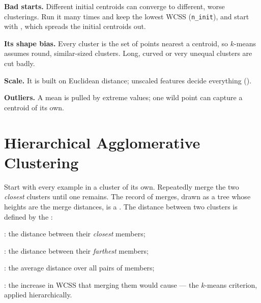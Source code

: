 \begin{alertbox}
\begin{tight}
  \item \textbf{Bad starts.} Different initial centroids can converge to different,
        worse clusterings. Run it many times and keep the lowest WCSS
        (\texttt{n\_init}), and start with , which spreads the
        initial centroids out.
  \item \textbf{Its shape bias.} Every cluster is the set of points nearest a
        centroid, so $k$-means assumes round, similar-sized clusters. Long,
        curved or very unequal clusters are cut badly.
  \item \textbf{Scale.} It is built on Euclidean distance; unscaled features
        decide everything ().
  \item \textbf{Outliers.} A mean is pulled by extreme values; one wild point can
        capture a centroid of its own.
\end{tight}
\end{alertbox}

\section{Hierarchical Agglomerative Clustering}

\begin{definitionbox}
Start with every example in a cluster of its own. Repeatedly merge the two
\emph{closest} clusters until one remains. The record of merges, drawn as a tree
whose heights are the merge distances, is a . The distance between
two clusters is defined by the :
\begin{tight}
  \item {}: the distance between their \emph{closest} members;
  \item {}: the distance between their \emph{farthest} members;
  \item {}: the average distance over all pairs of members;
  \item {}: the increase in WCSS that merging them would cause --- the
        $k$-means criterion, applied hierarchically.
\end{tight}
\end{definitionbox}

